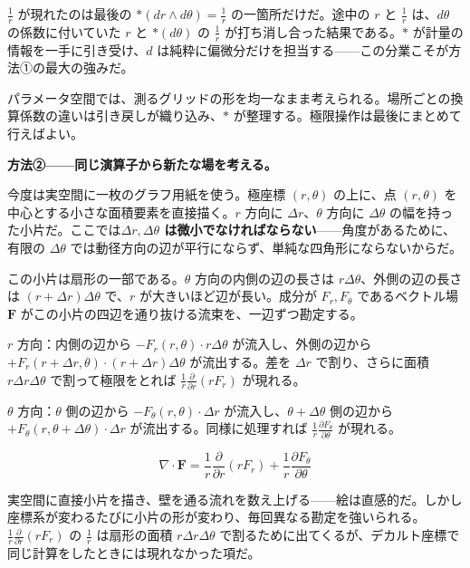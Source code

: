 \documentclass[a4paper,12pt,openany]{book}
\begin{document}
\(\frac{1}{r}\) が現れたのは最後の
\(\ast(dr\wedge d\theta) = \frac{1}{r}\) の一箇所だけだ。途中の \(r\) と
\(\frac{1}{r}\) は、\(d\theta\) の係数に付いていた \(r\) と
\(\ast(d\theta)\) の \(\frac{1}{r}\)
が打ち消し合った結果である。\(\ast\) が計量の情報を一手に引き受け、\(d\)
は純粋に偏微分だけを担当する——この分業こそが方法①の最大の強みだ。

パラメータ空間では、測るグリッドの形を均一なまま考えられる。場所ごとの換算係数の違いは引き戻しが織り込み、\(\ast\)
が整理する。極限操作は最後にまとめて行えばよい。

\textbf{方法②——同じ演算子から新たな場を考える。}

今度は実空間に一枚のグラフ用紙を使う。極座標 \((r,\theta)\) の上に、点
\((r,\theta)\) を中心とする小さな面積要素を直接描く。\(r\) 方向に
\(\Delta r\)、\(\theta\) 方向に \(\Delta\theta\)
の幅を持った小片だ。ここでは\textbf{$\Delta r, \Delta\theta$ は微小でなければならない}——角度があるために、有限の
\(\Delta\theta\)
では動径方向の辺が平行にならず、単純な四角形にならないからだ。

この小片は扇形の一部である。\(\theta\) 方向の内側の辺の長さは
\(r\Delta\theta\)、外側の辺の長さは \((r+\Delta r)\Delta\theta\)
で、\(r\) が大きいほど辺が長い。成分が \(F_r,F_\theta\) であるベクトル場
\(\mathbf{F}\) がこの小片の四辺を通り抜ける流束を、一辺ずつ勘定する。

\(r\) 方向：内側の辺から \(-F_r(r,\theta) \cdot r\Delta\theta\)
が流入し、外側の辺から
\(+F_r(r+\Delta r,\theta) \cdot (r+\Delta r)\Delta\theta\)
が流出する。差を \(\Delta r\) で割り、さらに面積
\(r\Delta r\Delta\theta\) で割って極限をとれば
\(\frac{1}{r}\frac{\partial}{\partial r}(rF_r)\) が現れる。

\(\theta\) 方向：\(\theta\) 側の辺から
\(-F_\theta(r,\theta) \cdot \Delta r\) が流入し、\(\theta+\Delta\theta\)
側の辺から \(+F_\theta(r,\theta+\Delta\theta) \cdot \Delta r\)
が流出する。同様に処理すれば
\(\frac{1}{r}\frac{\partial F_\theta}{\partial\theta}\) が現れる。

\[\nabla \cdot \mathbf{F} = \frac{1}{r}\frac{\partial}{\partial r}(r F_r) + \frac{1}{r}\frac{\partial F_\theta}{\partial \theta}\]

実空間に直接小片を描き、壁を通る流れを数え上げる——絵は直感的だ。しかし座標系が変わるたびに小片の形が変わり、毎回異なる勘定を強いられる。\(\frac{1}{r}\frac{\partial}{\partial r}(rF_r)\)
の \(\frac{1}{r}\) は扇形の面積 \(r\Delta r\Delta\theta\)
で割るために出てくるが、デカルト座標で同じ計算をしたときには現れなかった項だ。
\end{document}
